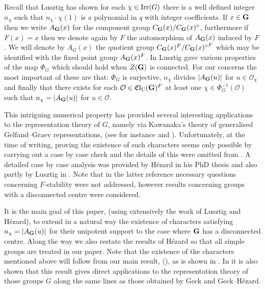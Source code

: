 \documentclass[eqthmnum]{jt-calcs}
\newcommand{\Clu}{\ensuremath{\mathfrak{Cl}_{\mathrm{U}}}}
\renewcommand{\cref}{\Cref}
\begin{document}
Recall that Lusztig has shown for each $\chi \in \operatorname{Irr}(G)$ there is a well defined integer $n_{\chi}$ such that $n_{\chi}\cdot \chi(1)$ is a polynomial in $q$ with integer coefficients. If $x \in \mathbf{G}$ then we write $A_{\mathbf{G}}(x)$ for the component group $C_{\mathbf{G}}(x)/C_{\mathbf{G}}(x)^{\circ}$, furthermore if $F(x) = x$ then we denote again by $F$ the automorphism of $A_{\mathbf{G}}(x)$ induced by $F$. We will denote by $A_G(x)$ the quotient group $C_{\mathbf{G}}(x)^F/{C_{\mathbf{G}}(x)^{\circ}}^F$ which may be identified with the fixed point group $A_{\mathbf{G}}(x)^F$. In \cite[\S13.4]{lusztig:1984:characters-of-reductive-groups} Lusztig gave various properties of the map $\Phi_G$ which should hold when $Z(\mathbf{G})$ is connected. For our concerns the most important of these are that: $\Phi_G$ is surjective, $n_{\chi}$ divides $|A_{\mathbf{G}}(u)|$ for $u \in \mathcal{O}_{\chi}$ and finally that there exists for each $\mathcal{O} \in \Clu(\bG)^F$ at least one $\chi \in \Phi_G^{-1}(\mathcal{O})$ such that $n_{\chi} = |A_{\mathbf{G}}(u)|$ for $u \in \mathcal{O}$.

This intriguing numerical property has provided several interesting applications to the representation theory of $G$, namely via Kawanaka's theory of generalised Gelfand--Graev representations, (see for instance \cite[\S3]{geck:1999:character-sheaves-and-GGGRs} and \cite[Theorem 4.5]{geck-hezard:2008:unipotent-support}). Unfortunately, at the time of writing, proving the existence of such characters seems only possible by carrying out a case by case check and the details of this were omitted from \cite[\S13.4]{lusztig:1984:characters-of-reductive-groups}. A detailed case by case analysis was provided by H\'{e}zard in his PhD thesis \cite{hezard:2004:thesis} and also partly by Lusztig in \cite{lusztig:2009:unipotent-classes-and-special-Weyl}. Note that in the latter reference necessary questions concerning $F$-stability were not addressed, however results concerning groups with a disconnected centre were considered.

It is the main goal of this paper, (using extensively the work of Lusztig and H\'{e}zard), to extend in a natural way the existence of characters satisfying $n_{\chi} = |A_{\mathbf{G}}(u)|$ for their unipotent support to the case where $\mathbf{G}$ has a disconnected centre. Along the way we also restate the results of H\'{e}zard so that all simple groups are treated in our paper. Note that the existence of the characters mentioned above will follow from our main result, (\cref{prop:A}), as is shown in \cite[Theorem 3.1]{taylor:2011:on-unipotent-supports}. In \cite{taylor:2011:on-unipotent-supports} it is also shown that this result gives direct applications to the representation theory of those groups $G$ along the same lines as those obtained by Geck and Geck--H\'{e}zard.
\end{document}
